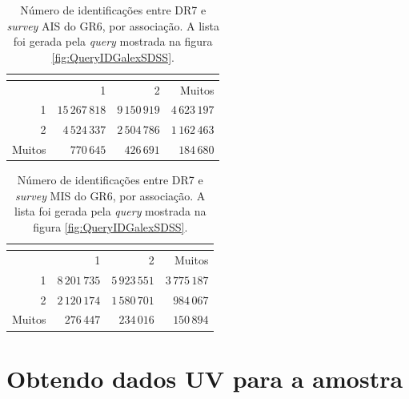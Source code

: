 \begin{table}
	\caption[Identificações entre \SDSS DR7 e {\em survey} AIS do \galex GR6.]
	{Número de identificações entre \SDSS DR7 e {\em survey} AIS do \galex GR6, por
	associação. A lista foi gerada pela {\em query} mostrada na figura
	\ref{fig:QueryIDGalexSDSS}.}
	\setlength{\tabcolsep}{1cm}
	\begin{tabular}{r r r r}
		\galex &          \multicolumn{3}{c}{\SDSS} \\
		\midrule
		       &              1 &             2 &        Muitos \\
		1      & $15\,267\,818$ & $9\,150\,919$ & $4\,623\,197$ \\
		2      &  $4\,524\,337$ & $2\,504\,786$ & $1\,162\,463$ \\
		Muitos &     $770\,645$ &    $426\,691$ &    $184\,680$ \\
	\end{tabular}
	\label{tab:SDSSxGalexMatchesAIS}
\end{table}

\begin{table}
	\caption[Identificações entre \SDSS DR7 e {\em survey} AIS do \galex GR6.]
	{Número de identificações entre \SDSS DR7 e {\em survey} MIS do \galex GR6, por
	associação. A lista foi gerada pela {\em query} mostrada na figura
	\ref{fig:QueryIDGalexSDSS}.}
	\setlength{\tabcolsep}{1cm}
	\begin{tabular}{r r r r}
		\galex &         \multicolumn{3}{c}{\SDSS} \\
		\midrule
		       &             1 &             2 &        Muitos \\
		1      & $8\,201\,735$ & $5\,923\,551$ & $3\,775\,187$ \\
		2      & $2\,120\,174$ & $1\,580\,701$ &    $984\,067$ \\
		Muitos &    $276\,447$ &    $234\,016$ &    $150\,894$ \\
	\end{tabular}
	\label{tab:SDSSxGalexMatchesMIS}
\end{table}



\section{Obtendo dados UV para a amostra \STARLIGHT}
\label{sec:Crossmatch:DefAmostras}

